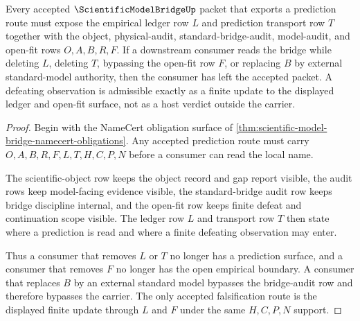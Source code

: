 \begin{theorem}
\label{thm:scientific-model-bridge-falsifiable-prediction}
Every accepted $\ScientificModelBridgeUp$ packet that exports a prediction route must expose the empirical ledger row $L$ and prediction transport row $T$ together with the object, physical-audit, standard-bridge-audit, model-audit, and open-fit rows $O,A,B,R,F$. If a downstream consumer reads the bridge while deleting $L$, deleting $T$, bypassing the open-fit row $F$, or replacing $B$ by external standard-model authority, then the consumer has left the accepted packet. A defeating observation is admissible exactly as a finite update to the displayed ledger and open-fit surface, not as a host verdict outside the carrier.
\end{theorem}
\begin{proof}
Begin with the NameCert obligation surface of \autoref{thm:scientific-model-bridge-namecert-obligations}. Any accepted prediction route must carry $O,A,B,R,F,L,T,H,C,P,N$ before a consumer can read the local name.

The scientific-object row keeps the object record and gap report visible, the audit rows keep model-facing evidence visible, the standard-bridge audit row keeps bridge discipline internal, and the open-fit row keeps finite defeat and continuation scope visible. The ledger row $L$ and transport row $T$ then state where a prediction is read and where a finite defeating observation may enter.

Thus a consumer that removes $L$ or $T$ no longer has a prediction surface, and a consumer that removes $F$ no longer has the open empirical boundary. A consumer that replaces $B$ by an external standard model bypasses the bridge-audit row and therefore bypasses the carrier. The only accepted falsification route is the displayed finite update through $L$ and $F$ under the same $H,C,P,N$ support.
\end{proof}

